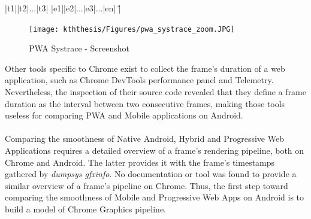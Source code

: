 \documentclass{kththesis}
\begin{document}
    |t1||t2|...|t3|
    |e1||e2|...|e3|...|en|
    \^
    |
    
    
    \begin{figure}
        \centering
        \texttt{[image: kththesis/Figures/pwa\_systrace\_zoom.JPG]}
        \caption{PWA Systrace - Screenshot}
        \label{fig:pwa_systrace_zoom}
    \end{figure}
    
    Other tools specific to Chrome exist to collect the frame's duration of a web application, such as Chrome DevTools performance panel and Telemetry. Nevertheless, the inspection of their source code revealed that they define a frame duration as the interval between two consecutive frames, making those tools useless for comparing PWA and Mobile applications on Android.
    
    \paragraph{}
    Comparing the smoothness of Native Android, Hybrid and Progressive Web Applications requires a detailed overview of a frame's rendering pipeline, both on Chrome and Android. The latter provides it with the frame's timestamps gathered by \textit{dumpsys gfxinfo}. No documentation or tool was found to provide a similar overview of a frame's pipeline on Chrome. Thus, the first step toward comparing the smoothness of Mobile and Progressive Web Apps on Android is to build a model of Chrome Graphics pipeline.

    
\end{document}
